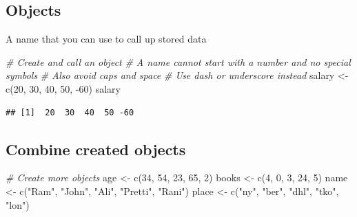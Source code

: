\documentclass[
]{article}
\newenvironment{Shaded}{\begin{snugshade}}{\end{snugshade}}
\newcommand{\CommentTok}[1]{\textcolor[rgb]{0.56,0.35,0.01}{\textit{#1}}}
\newcommand{\DecValTok}[1]{\textcolor[rgb]{0.00,0.00,0.81}{#1}}
\newcommand{\FunctionTok}[1]{\textcolor[rgb]{0.00,0.00,0.00}{#1}}
\newcommand{\NormalTok}[1]{#1}
\newcommand{\OtherTok}[1]{\textcolor[rgb]{0.56,0.35,0.01}{#1}}
\newcommand{\SpecialCharTok}[1]{\textcolor[rgb]{0.00,0.00,0.00}{#1}}
\newcommand{\StringTok}[1]{\textcolor[rgb]{0.31,0.60,0.02}{#1}}
\begin{document}
\hypertarget{objects}{%
\subsection{Objects}\label{objects}}

A name that you can use to call up stored data

\begin{Shaded}
\begin{Highlighting}[]
\CommentTok{\# Create and call an object}
\CommentTok{\# A name cannot start with a number and no special symbols}
\CommentTok{\# Also avoid caps and space}
\CommentTok{\# Use dash or underscore instead}
\NormalTok{salary }\OtherTok{\textless{}{-}} \FunctionTok{c}\NormalTok{(}\DecValTok{20}\NormalTok{, }\DecValTok{30}\NormalTok{, }\DecValTok{40}\NormalTok{, }\DecValTok{50}\NormalTok{, }\SpecialCharTok{{-}}\DecValTok{60}\NormalTok{)}
\NormalTok{salary}
\end{Highlighting}
\end{Shaded}

\begin{verbatim}
## [1]  20  30  40  50 -60
\end{verbatim}

\hypertarget{combine-created-objects}{%
\subsection{Combine created objects}\label{combine-created-objects}}

\begin{Shaded}
\begin{Highlighting}[]
\CommentTok{\# Create more objects}
\NormalTok{age }\OtherTok{\textless{}{-}} \FunctionTok{c}\NormalTok{(}\DecValTok{34}\NormalTok{, }\DecValTok{54}\NormalTok{, }\DecValTok{23}\NormalTok{, }\DecValTok{65}\NormalTok{, }\DecValTok{2}\NormalTok{)}
\NormalTok{books }\OtherTok{\textless{}{-}} \FunctionTok{c}\NormalTok{(}\DecValTok{4}\NormalTok{, }\DecValTok{0}\NormalTok{, }\DecValTok{3}\NormalTok{, }\DecValTok{24}\NormalTok{, }\DecValTok{5}\NormalTok{)}
\NormalTok{name }\OtherTok{\textless{}{-}} \FunctionTok{c}\NormalTok{(}\StringTok{"Ram"}\NormalTok{, }\StringTok{"John"}\NormalTok{, }\StringTok{"Ali"}\NormalTok{, }\StringTok{"Pretti"}\NormalTok{, }\StringTok{"Rani"}\NormalTok{)}
\NormalTok{place }\OtherTok{\textless{}{-}} \FunctionTok{c}\NormalTok{(}\StringTok{"ny"}\NormalTok{, }\StringTok{"ber"}\NormalTok{, }\StringTok{"dhl"}\NormalTok{, }\StringTok{"tko"}\NormalTok{, }\StringTok{"lon"}\NormalTok{)}
\end{Highlighting}
\end{Shaded}
\end{document}
